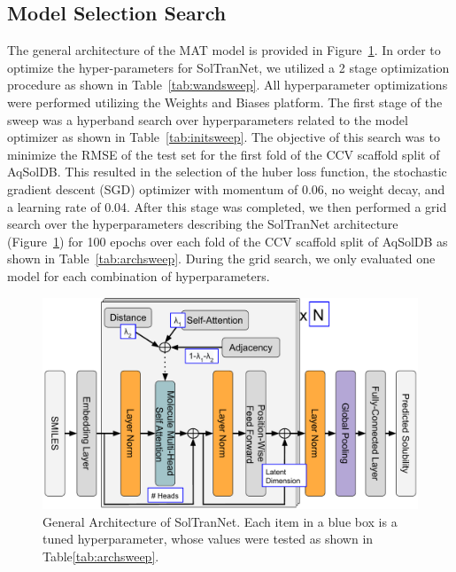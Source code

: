 \documentclass[journal=jmcmar,manuscript=article]{achemso}
\begin{document}
\subsection{Model Selection Search}
The general architecture of the MAT model is provided in Figure~\ref{fig:architecture}.
In order to optimize the hyper-parameters for SolTranNet, we utilized a 2 stage optimization procedure as shown in Table~\ref{tab:wandsweep}.
All hyperparameter optimizations were performed utilizing the Weights and Biases platform\cite{wandb}.
The first stage of the sweep was a hyperband search over hyperparameters related to the model optimizer as shown in Table~\ref{tab:initsweep}. 
The objective of this search was to minimize the RMSE of the test set for the first fold of the CCV scaffold split of AqSolDB.
This resulted in the selection of the huber loss function, the stochastic gradient descent (SGD) optimizer with momentum of 0.06, no weight decay, and a learning rate of 0.04.
After this stage was completed, we then performed a grid search over the hyperparameters describing the SolTranNet architecture (Figure~\ref{fig:architecture}) for 100 epochs over each fold of the CCV scaffold split of AqSolDB as shown in Table~\ref{tab:archsweep}.
During the grid search, we only evaluated one model for each combination of hyperparameters.

\begin{figure}[tb]
    \centering
    \includegraphics[width=\linewidth]{figures/soltrannet_architecture.pdf}
    \caption{General Architecture of SolTranNet. Each item in a blue box is a tuned hyperparameter, whose values were tested as shown in Table\ref{tab:archsweep}.}
    \label{fig:architecture}
\end{figure}
\end{document}
